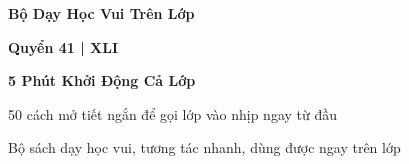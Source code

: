 \begin{titlepage}
\centering
\vspace*{2.2cm}
{\Large\bfseries\color{chapterline} Bộ Dạy Học Vui Trên Lớp\par}
\vspace{0.25cm}
{\large\bfseries\color{chapterline} Quyển 41 \;|\; XLI\par}
\vspace{1cm}
{\fontsize{24}{30}\selectfont\bfseries\color{titlecolor} 5 Phút Khởi Động Cả Lớp\par}
\vspace{0.7cm}
{\large 50 cách mở tiết ngắn để gọi lớp vào nhịp ngay từ đầu\par}
\vfill
{\normalsize Bộ sách dạy học vui, tương tác nhanh, dùng được ngay trên lớp\par}
\vspace*{1.8cm}
\end{titlepage}